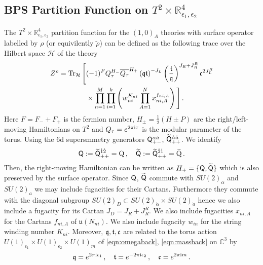 \documentclass[main.tex]{subfiles}
\begin{document}
\subsection{BPS Partition Function on \texorpdfstring{$T^2\times\mathbb{R}_{\epsilon_1,\epsilon_2}^4$}{T2 x R4}}
The $T^2\times\mathbb{R}_{\epsilon_1,\epsilon_2}^4$ partition function for the $(1,0)_A$ theories with surface operator labelled by $\rho$ (or equivilently $\tilde{\rho}$) can be defined as the following trace over the Hilbert space $\mathcal{H}$ of the theory \cite{Kim:2017xan,Bhattacharya:2008zy,Kim:2015gha}
\begin{equation}
\begin{aligned}
Z^{\rho}=\operatorname{Tr}_{\mathcal{H}}\Bigg[&(-1)^FQ_{\tau}^{H_-}\overline{Q_{\tau}}^{H_+}\left(\mathfrak{q}\mathfrak{t}\right)^{-J_L}\left(\frac{\mathfrak{t}}{\mathfrak{q}}\right)^{J_R+J_R^R}\mathfrak{c}^{2J_L^R}\\
&\times\prod_{n=1}^M\prod_{i=1}^k\left(w_{ni}^{K_{ni}}\prod_{A=1}^{N}x_{ni,A}^{f_{ni,A}}\right)\Bigg]\,.
\end{aligned}
\end{equation}
Here $F=F_-+F_+$ is the fermion number, $H_{\pm}=\frac{1}{2}(H\pm P)$ are the right/left-moving Hamiltonians on $T^2$ and $Q_{\tau}=e^{2\pi\mathrm{i}\tau}$ is the modular parameter of the torus. Using the 6d supersmmetry generators $\mathsf{Q}_{+-}^{\alpha \dot a}$, $\widetilde{\mathsf{Q}}_{++}^{\dot\alpha \dot a}$. 
We identify
\begin{equation}
\mathsf{Q}:=\widetilde{\mathsf{Q}}_{++}^{\dot1 \dot 2}=\mathrm{Q}\,,\quad\widetilde{\mathsf{Q}}:=\widetilde{\mathsf{Q}}_{++}^{\dot2 \dot 1}=\widetilde{\mathrm{Q}}\,.
\end{equation}
Then, the right-moving Hamiltonian can be written as $H_+=\{\mathsf{Q},\widetilde{\mathsf{Q}}\}$ which is also preserved by the surface operator. Since $\mathsf{Q}$, $\widetilde{\mathsf{Q}}$ commute with $SU(2)_{\alpha}$ and $SU(2)_{a}$ we may include fugacities for their Cartans. Furthermore they commute with the diagonal subgroup $SU(2)_D\subset SU(2)_{\dot\alpha}\times SU(2)_{\dot a}$ hence we also include a fugacity for its Cartan $J_D=J_R+J^R_R$. We also include fugacities $x_{ni,A}$ for the Cartans $f_{ni,A}$ of $\mathfrak{u}(N_{ni})$. We also include fugacity $w_{in}$ for the string winding number $K_{ni}$. Moreover, $\mathfrak{q},\mathfrak{t},\mathfrak{c}$ are related to the torus action $U(1)_{\epsilon_1}\times U(1)_{\epsilon_2}\times U(1)_{m}$ of \eqref{eqn:omegaback}, \eqref{eqn:massback} on $\mathbb{C}^3$ by
\begin{equation}
\mathfrak{q}=e^{2\pi\mathrm{i}\epsilon_1}\,,\quad \mathfrak{t}=e^{-2\pi\mathrm{i}\epsilon_2}\,,\quad \mathfrak{c}=e^{2\pi\mathrm{i} m}\,.
\end{equation}
\end{document}
